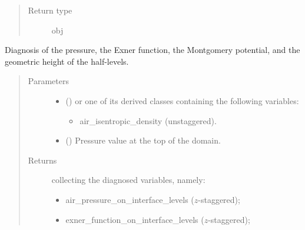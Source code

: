 \documentclass[letterpaper,10pt,english]{sphinxmanual}
\begin{document}
\begin{fulllineitems}
\begin{fulllineitems}
\begin{quote}
\begin{description}
\begin{itemize}
\end{itemize}


\item[{Return type}] \leavevmode
obj

\end{description}\end{quote}

\end{fulllineitems}


\begin{fulllineitems}
\label{\detokenize{api:dycore.diagnostic_isentropic.DiagnosticIsentropic.get_diagnostic_variables}}
Diagnosis of the pressure, the Exner function, the Montgomery potential, and the geometric height of the half-levels.
\begin{quote}\begin{description}
\item[{Parameters}] \leavevmode\begin{itemize}
\item {} 
 () \textendash{} 
{\hyperref[\detokenize{api:storages.grid_data.GridData}]{}} or one of its derived classes containing the following variables:
\begin{itemize}
\item {} 
air\_isentropic\_density (unstaggered).

\end{itemize}


\item {} 
 () \textendash{} Pressure value at the top of the domain.

\end{itemize}

\item[{Returns}] \leavevmode

{\hyperref[\detokenize{api:storages.grid_data.GridData}]{}} collecting the diagnosed variables, namely:
\begin{itemize}
\item {} 
air\_pressure\_on\_interface\_levels (\(z\)-staggered);

\item {} 
exner\_function\_on\_interface\_levels (\(z\)-staggered);


\end{itemize}
\end{description}
\end{quote}
\end{fulllineitems}
\end{fulllineitems}
\end{document}
